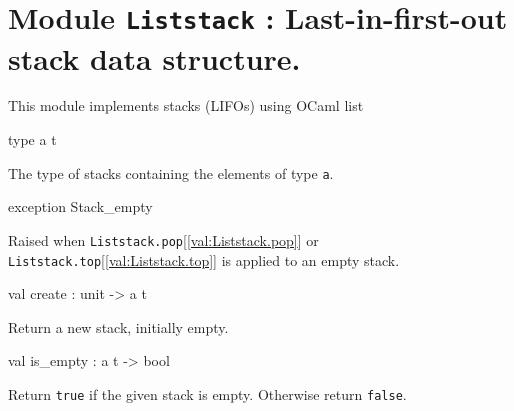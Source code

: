 \documentclass[11pt]{article}
\begin{document}
\tableofcontents
\section{Module {\tt{Liststack}} : Last-in-first-out stack data structure.}
\label{module:Liststack}



 	This module implements stacks (LIFOs) using OCaml list



\ocamldocvspace{0.5cm}



\label{type:Liststack.t}\begin{ocamldoccode}
type {\textquotesingle}a t 
\end{ocamldoccode}
\begin{ocamldocdescription}
The type of stacks containing the elements of type {\tt{{\textquotesingle}a}}.


\end{ocamldocdescription}




\label{exception:Liststack.Stack-underscoreempty}\begin{ocamldoccode}
exception Stack_empty
\end{ocamldoccode}
\begin{ocamldocdescription}
Raised when {\tt{Liststack.pop}}[\ref{val:Liststack.pop}] or {\tt{Liststack.top}}[\ref{val:Liststack.top}] is applied to an empty stack.


\end{ocamldocdescription}




\label{val:Liststack.create}\begin{ocamldoccode}
val create : unit -> {\textquotesingle}a t
\end{ocamldoccode}
\begin{ocamldocdescription}
Return a new stack, initially empty.


\end{ocamldocdescription}




\label{val:Liststack.is-underscoreempty}\begin{ocamldoccode}
val is_empty : {\textquotesingle}a t -> bool
\end{ocamldoccode}
\begin{ocamldocdescription}
Return {\tt{true}} if the given stack is empty. Otherwise return {\tt{false}}.


\end{ocamldocdescription}
\end{document}
